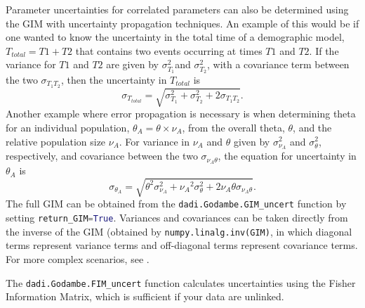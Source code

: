 \documentclass[12pt]{article}
\makeatletter
\newcommand{\py}[1]{\lstinline[language=Python, showstringspaces=False]@#1@}
\makeatother
\begin{document}
Parameter uncertainties for correlated parameters can also be determined using the GIM with uncertainty propagation techniques.
An example of this would be if one wanted to know the uncertainty in the total time of a demographic model, ${T_{total}}=T1+T2$ that contains two events occurring at times ${T1}$ and ${T2}$.
If the variance for $T1$ and $T2$ are given by $\sigma_{T_1}^2$and $\sigma_{T_2}^2$, with a covariance term between the two $\sigma_{T_1T_2}$, then the uncertainty in ${T_{total}}$ is 
\begin{equation}
\sigma_{T_{total}}=\sqrt{\sigma_{T_1}^2+\sigma_{T_2}^2+2\sigma_{T_1T_2}}.
\end{equation}
Another example where error propagation is necessary is when determining theta for an individual population, $\theta_{A}=\theta \times  \nu_{A}$, from the overall theta, $\theta$, and the relative population size $\nu_{A}$.
For variance in $\nu_{A}$ and $\theta$ given by $\sigma_{\nu_{A}}^2$ and $\sigma_{\theta}^2$, respectively, and covariance between the two $\sigma_{\nu_{A}\theta}$, the equation for uncertainty in $\theta_{A}$ is
\begin{equation}
\sigma_{{\theta_{A}}}=\sqrt{\theta^2\sigma_{\nu_{A}}^2+{\nu_{A}}^2\sigma_{\theta}^2+2 \nu_{A} \theta \sigma_{\nu_{A}\theta}}.
\end{equation}
The full GIM can be obtained from the \py{dadi.Godambe.GIM_uncert} function by setting \py{return_GIM=True}.
Variances and covariances can be taken directly from the inverse of the GIM (obtained by \py{numpy.linalg.inv(GIM)}, in which diagonal terms represent variance terms and off-diagonal terms represent covariance terms.
For more complex scenarios, see \cite{Ku1966}.

The \py{dadi.Godambe.FIM_uncert} function calculates uncertainties using the Fisher Information Matrix, which is sufficient if your data are unlinked.
\end{document}
